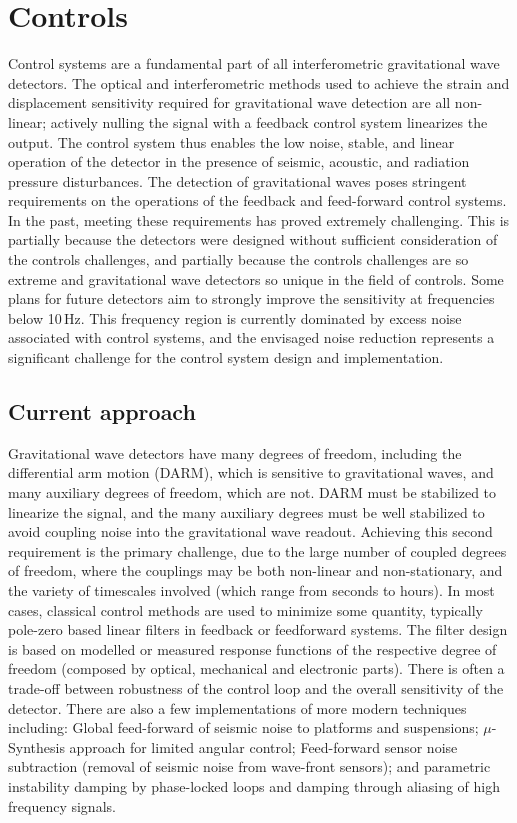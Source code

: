 \section{Controls}
\label{sec:Controls}
Control systems are a fundamental part of all interferometric gravitational wave detectors. The optical and interferometric methods used to achieve the strain and displacement sensitivity required for gravitational wave detection are all non-linear; actively nulling the signal with a feedback control system linearizes the output. The control system thus enables the low noise, stable, and linear operation of the detector in the presence of seismic, acoustic, and radiation pressure disturbances.
The detection of gravitational waves poses stringent requirements on the operations of the feedback and feed-forward control systems.
In the past, meeting these requirements has proved extremely challenging.
This is partially because the detectors were designed without sufficient consideration of the controls challenges, and partially because the controls challenges are so extreme and gravitational wave detectors so unique in the field of controls.
Some plans for future detectors aim to strongly improve the sensitivity at frequencies below 10\,Hz. This frequency region is currently dominated by excess noise associated with control systems, and the envisaged noise reduction represents a significant challenge for the control system design and implementation.

\subsection{Current approach}
Gravitational wave detectors have many degrees of freedom,  including the differential arm motion (DARM), which is sensitive to gravitational waves, and many auxiliary degrees of freedom, which are not. DARM must be stabilized to linearize the signal, and the many auxiliary degrees must be well stabilized to avoid coupling noise into the gravitational wave readout. Achieving this second requirement is the primary challenge, due to the large number of coupled degrees of freedom, where the couplings may be both non-linear and non-stationary, and the variety of timescales involved (which range from seconds to hours).
In most cases, classical control methods are used to minimize some quantity, typically pole-zero based linear filters in feedback or feedforward systems.
The filter design is based on modelled or measured response functions of the respective degree of freedom (composed by optical, mechanical and electronic parts). There is often a trade-off between robustness of the control loop and the overall sensitivity of the detector.
There are also a few implementations of more modern techniques including:
Global feed-forward of seismic noise to platforms and suspensions; $\mu$-Synthesis approach for limited angular control; Feed-forward sensor noise subtraction (removal of seismic noise from wave-front sensors); and parametric instability damping by phase-locked loops and damping through aliasing of high frequency signals.

